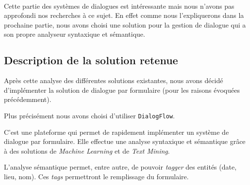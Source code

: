 ~\\\indent
Cette partie des systèmes de dialogues est intéressante mais nous n'avons pas approfondi nos recherches à ce sujet. En effet comme nous l'expliquerons dans la prochaine partie, nous avons choisi une solution pour la gestion de dialogue qui a son propre analyseur syntaxique et sémantique.

\subsection{Description de la solution retenue}
Après cette analyse des différentes solutions existantes, nous avons décidé d'implémenter la solution de dialogue par formulaire (pour les raisons évoquées précédemment). 

Plus précisément nous avons choisi d'utiliser \texttt{DialogFlow}. 

C'est une plateforme qui permet de rapidement implémenter un système de dialogue par formulaire. Elle effectue une analyse syntaxique et sémantique grâce à des solutions de \textit{Machine Learning} et de \emph{Text Mining}. 

L'analyse sémantique permet, entre autre, de pouvoir \emph{tagger} des entités (date, lieu, nom). Ces \emph{tags} permettront le remplissage du formulaire.
